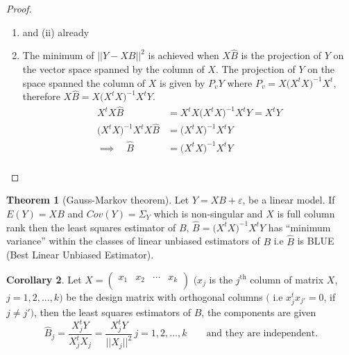 \documentclass[11pt,a4paper]{article}
\theoremstyle{definition}
\newtheorem{thm}{Theorem}[subsection]
\newtheorem{coro}[thm]{Corollary}
\begin{document}
\begin{proof}
\begin{enumerate}
\item[(i)] and (ii) already
\item[iii).] The minimum of $||Y-XB||^2$ is achieved when $X\widehat{B}$ is the projection of $Y$ on the vector space spanned by the column of $X$. The projection of $Y$ on  the space spanned the column of $X$ is given by $P_vY$ where $P_v=X\big(X^tX\big)^{-1}X^t$, therefore $X\widehat{B}=X\big(X^tX\big)^{-1}X^tY$.
\begin{align*}
X^tX\widehat{B} & = X^tX\big(X^tX\big)^{-1}X^tY=X^tY\\
\big(X^tX\big)^{-1}X^tX\widehat{B} & = \big(X^tX\big)^{-1}X^tY\\
\implies \quad  \widehat{B} & = \big(X^tX\big)^{-1}X^tY\\
\end{align*}
\end{enumerate}
\end{proof}


\begin{thm}[Gauss-Markov theorem]\label{res:thm:2.3.4}
Let $Y=XB+\varepsilon$, be a linear model. If $E(Y)=XB$ and $Cov(Y)=\Sigma_Y$ which is non-singular and $X$ is full column rank then the least squares estimator of $B, \, \widehat{B}=\big(X^tX\big)^{-1}X^tY$ has ``minimum variance'' within the classes of linear unbiased estimators of $B$ i.e $\widehat{B}$ is BLUE (Best Linear Unbiased Estimator).
\end{thm}


\begin{coro}\label{res:coro:2.3.5}
Let $X=
\begin{pmatrix}
x_1 & x_2 & \cdots & x_k\\
\end{pmatrix}
$ $\big(x_j$ is the $j^{\text{th}}$ column of matrix $X$, $j=1,2,\ldots ,k\big)$ be the design matrix with orthogonal columns $\big($ i.e $x^t_jx_{j'}=0$, if $j\neq j'\big)$, then the least squares estimators of $B$, the components are given $$\widehat{B}_j=\frac{X_j^tY}{X^t_jX_j}=\frac{X^t_jY}{||X_j||^2}\, j=1,2,\ldots ,k\qquad  \text{and they are independent.}$$
\end{coro}
\end{document}
